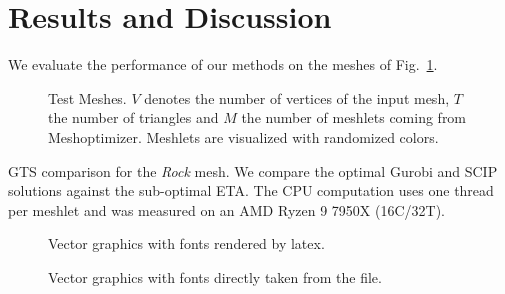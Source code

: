 \section{Results and Discussion}\label{Sec:Evaluation}

We evaluate the performance of our methods on the meshes of Fig.~\ref{fig:meshes}.



\begin{figure}
    \centering%
    \def\svgwidth{\textwidth}%
    \fontsize{6pt}{5pt}\selectfont%
    \caption{Test Meshes.
    $V$ denotes the number of vertices of the input mesh, $T$ the number of triangles and $M$ the number of meshlets coming from Meshoptimizer.
    Meshlets are visualized with randomized colors.
    }\label{fig:meshes}%
\end{figure}%

\begin{table}
    \caption{\acs{GTS} comparison for the \textit{Rock} mesh.
    We compare the optimal Gurobi and SCIP solutions against the sub-optimal \acs{ETA}.
    The CPU computation uses one thread per meshlet and was measured on an AMD Ryzen 9 7950X (16C/32T).    
    }\label{tab:StripifyTable}    
    {
    \centering    
    
    }
\end{table}


\begin{figure}
    
    \caption{Vector graphics with fonts rendered by latex.}\label{fig:latexfonts}
\end{figure}

\begin{figure}
    
    \caption{Vector graphics with fonts directly taken from the file.}\label{fig:svgfonts}
\end{figure}

